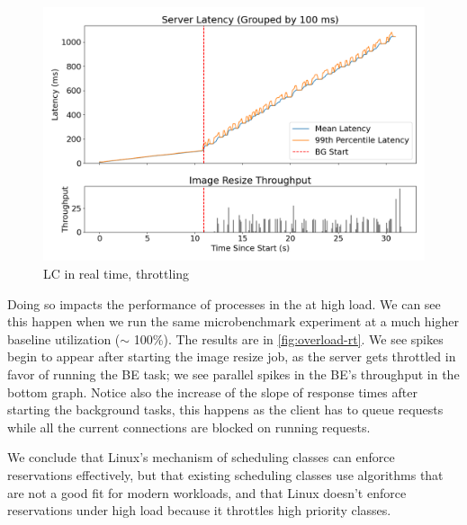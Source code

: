 \begin{figure}[t]
    \centering
    \includegraphics[width=\columnwidth]{graphs/overload-rt.png}
    \caption{LC in real time, throttling}\label{fig:overload-rt}
\end{figure}

Doing so impacts the performance of processes in the \rtclass{} at high load. We
can see this happen when we run the same microbenchmark experiment at a much
higher baseline utilization ($\sim$ 100\%). The results are in
\autoref{fig:overload-rt}. We see spikes begin to appear after starting the
image resize job, as the \rtclass{} server gets throttled in favor of running
the BE task; we see parallel spikes in the BE's throughput in the bottom graph.
Notice also the increase of the slope of response times after starting the
background tasks, this happens as the client has to queue requests while all the
current connections are blocked on running requests.

We conclude that Linux's mechanism of scheduling classes can enforce
reservations effectively, but that existing scheduling classes use algorithms
that are not a good fit for modern workloads, and that Linux doesn't enforce
reservations under high load because it throttles high priority classes.





